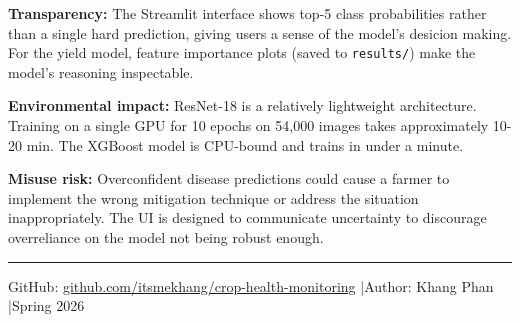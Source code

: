 \documentclass[11pt, letterpaper]{article}
\begin{document}
\textbf{Transparency:} The Streamlit interface shows top-5 class probabilities rather than a single hard prediction, giving users a sense of the model's desicion making. For the yield model, feature importance plots (saved to \texttt{results/}) make the model's reasoning inspectable.

\textbf{Environmental impact:} ResNet-18 is a relatively lightweight architecture. Training on a single GPU for 10 epochs on 54,000 images takes approximately 10-20 min. The XGBoost model is CPU-bound and trains in under a minute.

\textbf{Misuse risk:} Overconfident disease predictions could cause a farmer to implement the wrong mitigation technique or address the situation inappropriately. The UI is designed to communicate uncertainty to discourage overreliance on the model not being robust enough.

\vspace{1em}
\hrule
\vspace{0.5em}
\begin{center}
\small GitHub: \href{https://github.com/itsmekhang/crop-health-monitoring}{github.com/itsmekhang/crop-health-monitoring} \quad|\quad Author: Khang Phan \quad|\quad Spring 2026
\end{center}
\end{document}
